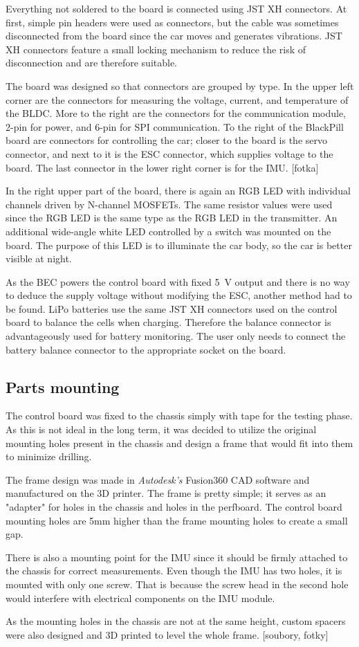 Everything not soldered to the board is connected using JST XH connectors. At first, simple pin headers were used as connectors, but the cable was sometimes disconnected from the board since the car moves and generates vibrations. JST XH connectors feature a small locking mechanism to reduce the risk of disconnection and are therefore suitable.

The board was designed so that connectors are grouped by type. In the upper left corner are the connectors for measuring the voltage, current, and temperature of the BLDC. More to the right are the connectors for the communication module, 2-pin for power, and 6-pin for SPI communication. To the right of the BlackPill board are connectors for controlling the car; closer to the board is the servo connector, and next to it is the ESC connector, which supplies voltage to the board. The last connector in the lower right corner is for the IMU. [\todo fotka]

In the right upper part of the board, there is again an RGB LED with individual channels driven by N-channel MOSFETs. The same resistor values were used since the RGB LED is the same type as the RGB LED in the transmitter. An additional wide-angle white LED controlled by a switch was mounted on the board. The purpose of this LED is to illuminate the car body, so the car is better visible at night.

As the BEC powers the control board with fixed \SI{5}{\V} output and there is no way to deduce the supply voltage without modifying the ESC, another method had to be found. LiPo batteries use the same JST XH connectors used on the control board to balance the cells when charging. Therefore the balance connector is advantageously used for battery monitoring. The user only needs to connect the battery balance connector to the appropriate socket on the board.

\subsection{Parts mounting}
The control board was fixed to the chassis simply with tape for the testing phase. As this is not ideal in the long term, it was decided to utilize the original mounting holes present in the chassis and design a frame that would fit into them to minimize drilling.

The frame design was made in \textit{Autodesk's} Fusion360 CAD software and manufactured on the 3D printer. The frame is pretty simple; it serves as an "adapter" for holes in the chassis and holes in the perfboard. The control board mounting holes are 5mm higher than the frame mounting holes to create a small gap.

There is also a mounting point for the IMU since it should be firmly attached to the chassis for correct measurements. Even though the IMU has two holes, it is mounted with only one screw. That is because the screw head in the second hole would interfere with electrical components on the IMU module.

As the mounting holes in the chassis are not at the same height, custom spacers were also designed and 3D printed to level the whole frame.
[\todo soubory, fotky]
